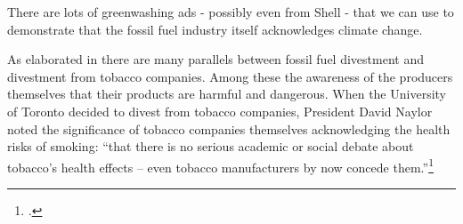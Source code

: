 \begin{vcom}
There are lots of greenwashing ads - possibly even from Shell - that we can use to demonstrate that the fossil fuel industry itself acknowledges climate change.
\end{vcom}



As elaborated in  there are many parallels between fossil fuel divestment and divestment from tobacco companies.
Among these the awareness of the producers themselves that their products are harmful and dangerous.
When the University of Toronto decided to divest from tobacco companies, President David Naylor noted the significance of tobacco companies themselves acknowledging the health risks of smoking: ``that there is no serious academic or social debate about tobacco's health effects – even tobacco manufacturers by now concede them.''\footcite[][]{TStarSellOff}



